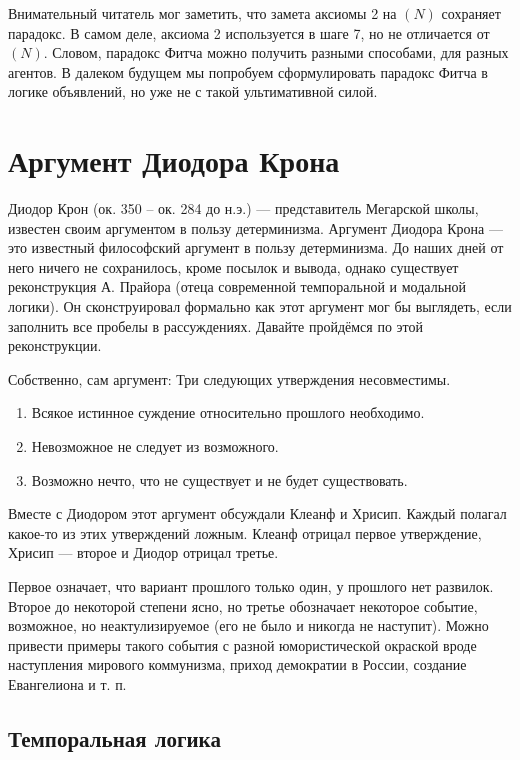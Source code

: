 \documentclass[openany]{book}
\theoremstyle{plain}
\theoremstyle{definition}
\begin{document}
Внимательный читатель мог заметить, что замета аксиомы 2 на \((N)\) сохраняет парадокс. В самом деле, аксиома 2 используется в шаге 7, но не отличается от \((N)\). Словом, парадокс Фитча можно получить разными способами, для разных агентов. В далеком будущем мы попробуем сформулировать парадокс Фитча в логике объявлений, но уже не с такой ультимативной силой.

\section{ Аргумент Диодора Крона }

Диодор Крон (ок. 350 -- ок. 284 до н.э.) --- представитель Мегарской школы, известен своим аргументом в пользу детерминизма. Аргумент Диодора Крона --- это известный философский аргумент в пользу детерминизма. До наших дней от него ничего не сохранилось, кроме посылок и вывода, однако существует реконструкция А. Прайора (отеца современной темпоральной и модальной логики). Он сконструировал формально как этот аргумент мог бы выглядеть, если заполнить все пробелы в рассуждениях. Давайте пройдёмся по этой реконструкции.

Собственно, сам аргумент:
Три следующих утверждения несовместимы.
\begin{enumerate}
\item Всякое истинное суждение относительно прошлого необходимо.
\item Невозможное не следует из возможного.
\item Возможно нечто, что не существует и не будет существовать.
\end{enumerate}

Вместе с Диодором этот аргумент обсуждали Клеанф и Хрисип. Каждый полагал какое-то из этих утверждений ложным. Клеанф отрицал первое утверждение, Хрисип --- второе и Диодор отрицал третье.

Первое означает, что вариант прошлого только один, у прошлого нет развилок. Второе до некоторой степени ясно, но третье обозначает некоторое событие, возможное, но неактулизируемое (его не было и никогда не наступит). Можно привести примеры такого события с разной юмористической окраской вроде наступления мирового коммунизма, приход демократии в России, создание Евангелиона и т. п.

\subsection{ Темпоральная логика }
\end{document}
